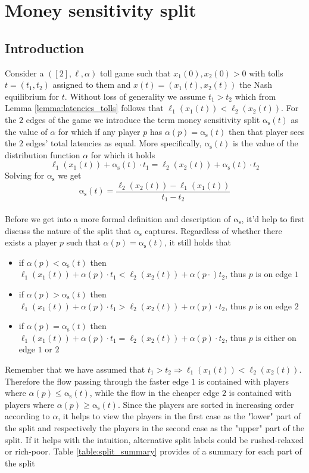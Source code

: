 \documentclass[10pt,a4paper]{book}
\newcommand{\as}{\mathrm{\alpha_s}}
\theoremstyle{definition}
\theoremstyle{comment}
\begin{document}
\chapter{Money sensitivity split}

\section{Introduction}

Consider a $([2], \ell, \alpha)$ toll game such that $x_1(0), x_2(0) > 0$ with tolls $t = (t_1, t_2)$ assigned to them and  $x(t) = (x_1(t), x_2(t))$ the Nash equilibrium for $t$.
Without loss of generality we assume $t_1 > t_2$ which from Lemma \ref{lemma:latencies_tolls} follows that $\ell_1(x_1(t)) < \ell_2(x_2(t))$.
For the $2$ edges of the game we introduce the term money sensitivity split $\as(t)$ as the value of $\alpha$ for which if any player $p$ has $\alpha(p)=\as(t)$ then that player sees the $2$ edges' total latencies as equal.
More specifically, $\as(t)$ is the value of the distribution function $\alpha$ for which it holds
\[\ell_1(x_1(t)) + \as(t) \cdot t_1 = \ell_2(x_2(t)) + \as(t) \cdot t_2\]
Solving for $\as$ we get
\[\as(t) = \frac{\ell_2(x_2(t)) - \ell_1(x_1(t))}{t_1 - t_2}\]
\\
Before we get into a more formal definition and description of $\as$, it'd help to first discuss the nature of the split that $\as$ captures.
Regardless of whether there exists a player $p$ such that $\alpha(p) = \as(t)$, it still holds that
\begin{itemize}
	\item if $\alpha(p) < \as(t)$ then $\ell_1(x_1(t)) + \alpha(p) \cdot t_1 < \ell_2(x_2(t)) + \alpha(p \cdot) t_2$, thus $p$ is on edge $1$
	\item if $\alpha(p) > \as(t)$ then $\ell_1(x_1(t)) + \alpha(p) \cdot t_1 > \ell_2(x_2(t)) + \alpha(p) \cdot t_2$, thus $p$ is on edge $2$
	\item if $\alpha(p) = \as(t)$ then $\ell_1(x_1(t)) + \alpha(p) \cdot t_1 = \ell_2(x_2(t)) + \alpha(p) \cdot t_2$, thus $p$ is either on edge $1$ or $2$
\end{itemize}
Remember that we have assumed that $t_1 > t_2 \Rightarrow \ell_1(x_1(t)) < \ell_2(x_2(t))$.
Therefore the flow passing through the faster edge $1$ is contained with players where $\alpha(p) \le \as(t)$, while the flow in the cheaper edge $2$ is contained with players where $\alpha(p) \ge \as(t)$.
Since the players are sorted in increasing order according to $\alpha$, it helps to view the players in the first case as the "lower" part of the split and respectively the players in the second case as the "upper" part of the split.
If it helps with the intuition, alternative split labels could be rushed-relaxed or rich-poor.
Table \autoref{table:split_summary} provides of a summary for each part of the split
\end{document}
